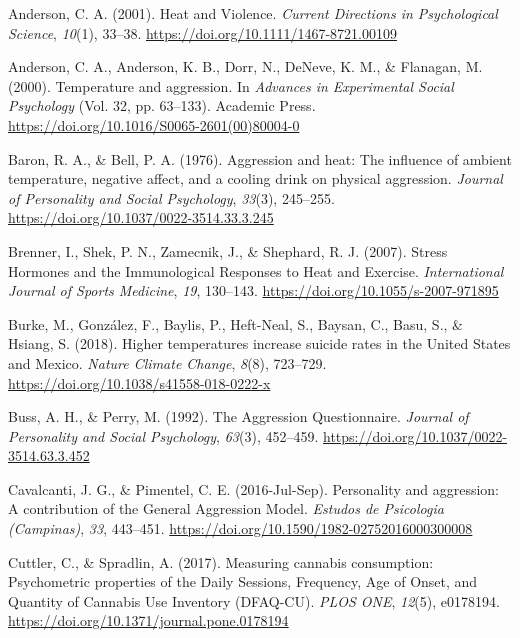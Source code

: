 \documentclass[
  man,
  floatsintext,
  longtable,
  nolmodern,
  notxfonts,
  notimes,
  colorlinks=true,linkcolor=blue,citecolor=blue,urlcolor=blue]{apa7}
\newlength{\cslhangindent}
\newenvironment{CSLReferences}[2] %
 {\begin{list}{}{%
  \setlength{\itemindent}{0pt}
  \setlength{\leftmargin}{0pt}
  \setlength{\parsep}{0pt}
  \ifodd #1
   \setlength{\leftmargin}{\cslhangindent}
   \setlength{\itemindent}{-1\cslhangindent}
  \fi
  \setlength{\itemsep}{#2\baselineskip}}}
 {\end{list}}
\begin{document}
\label{refs}
\begin{CSLReferences}{1}{0}
Anderson, C. A. (2001). Heat and {Violence}. \emph{Current Directions in
Psychological Science}, \emph{10}(1), 33--38.
\url{https://doi.org/10.1111/1467-8721.00109}

Anderson, C. A., Anderson, K. B., Dorr, N., DeNeve, K. M., \& Flanagan,
M. (2000). Temperature and aggression. In \emph{Advances in
{Experimental Social Psychology}} (Vol. 32, pp. 63--133). Academic
Press. \url{https://doi.org/10.1016/S0065-2601(00)80004-0}

Baron, R. A., \& Bell, P. A. (1976). Aggression and heat: {The}
influence of ambient temperature, negative affect, and a cooling drink
on physical aggression. \emph{Journal of Personality and Social
Psychology}, \emph{33}(3), 245--255.
\url{https://doi.org/10.1037/0022-3514.33.3.245}

Brenner, I., Shek, P. N., Zamecnik, J., \& Shephard, R. J. (2007).
Stress {Hormones} and the {Immunological Responses} to {Heat} and
{Exercise}. \emph{International Journal of Sports Medicine}, \emph{19},
130--143. \url{https://doi.org/10.1055/s-2007-971895}

Burke, M., González, F., Baylis, P., Heft-Neal, S., Baysan, C., Basu,
S., \& Hsiang, S. (2018). Higher temperatures increase suicide rates in
the {United States} and {Mexico}. \emph{Nature Climate Change},
\emph{8}(8), 723--729. \url{https://doi.org/10.1038/s41558-018-0222-x}

Buss, A. H., \& Perry, M. (1992). The {Aggression Questionnaire}.
\emph{Journal of Personality and Social Psychology}, \emph{63}(3),
452--459. \url{https://doi.org/10.1037/0022-3514.63.3.452}

Cavalcanti, J. G., \& Pimentel, C. E. (2016-Jul-Sep). Personality and
aggression: {A} contribution of the {General Aggression Model}.
\emph{Estudos de Psicologia (Campinas)}, \emph{33}, 443--451.
\url{https://doi.org/10.1590/1982-02752016000300008}

Cuttler, C., \& Spradlin, A. (2017). Measuring cannabis consumption:
{Psychometric} properties of the {Daily Sessions}, {Frequency}, {Age} of
{Onset}, and {Quantity} of {Cannabis Use Inventory} ({DFAQ-CU}).
\emph{PLOS ONE}, \emph{12}(5), e0178194.
\url{https://doi.org/10.1371/journal.pone.0178194}


\end{CSLReferences}
\end{document}
